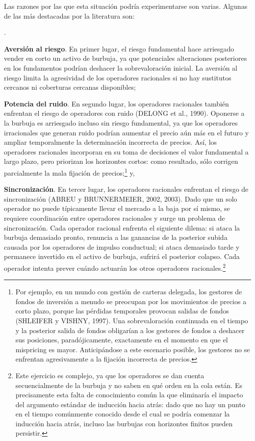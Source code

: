 \documentclass[10pt,a4paper]{article}
\newcounter{numitem}
\newenvironment{lnum}
      {\begin{list}{\arabic{numitem}.}{%
          \usecounter{numitem}%
          \setlength{\leftmargin}{1cm}%
          \setlength{\parskip}{3pt}%
          \setlength{\itemsep}{0pt}%
          \setlength{\parsep}{0pt}%
      }}
      {\end{list}}
\begin{document}
Las razones por las que esta situación podría experimentarse son varias. Algunas de las más destacadas por la literatura son:
\begin{lnum}
    \item \textbf{Aversión al riesgo}. En primer lugar, el riesgo fundamental hace arriesgado vender en corto un activo de burbuja, ya que potenciales alteraciones posteriores en los fundamentos podrían deshacer la sobrevaloración inicial. La aversión al riesgo limita la agresividad de los operadores racionales si no hay sustitutos cercanos ni coberturas cercanas disponibles;
    \item \textbf{Potencia del ruido}. En segundo lugar, los operadores racionales también enfrentan el riesgo de operadores con ruido (DELONG et al., 1990). Oponerse a la burbuja es arriesgado incluso sin riesgo fundamental, ya que los operadores irracionales que generan ruido podrían aumentar el precio aún más en el futuro y ampliar temporalmente la determinación incorrecta de precios. Así, los operadores racionales incorporan en su toma de decisiones el valor fundamental a largo plazo, pero priorizan los horizontes cortos: como resultado, sólo corrigen parcialmente la mala fijación de precios;\footnote{%
        Por ejemplo, en un mundo con gestión de carteras delegada, los gestores de fondos de inversión a menudo se preocupan por los movimientos de precios a corto plazo, porque las pérdidas temporales provocan salidas de fondos (SHLEIFER y VISHNY, 1997). Una sobrevaloración continuada en el tiempo y la posterior salida de fondos obligarían a los gestores de fondos a deshacer sus posiciones, paradójicamente, exactamente en el momento en que el mispricing es mayor. Anticipándose a este escenario posible, los gestores no se enfrentan agresivamente a la fijación incorrecta de precios.
    } y,
    \item \textbf{Sincronización}. En tercer lugar, los operadores racionales enfrentan el riesgo de sincronización (ABREU y BRUNNERMEIER, 2002, 2003). Dado que un solo operador no puede típicamente llevar el mercado a la baja por sí mismo, se requiere coordinación entre operadores racionales y surge un problema de sincronización. Cada operador racional enfrenta el siguiente dilema: si ataca la burbuja demasiado pronto, renuncia a las ganancias de la posterior subida causada por los operadores de impulso conductual; si ataca demasiado tarde y permanece invertido en el activo de burbuja, sufrirá el posterior colapso. Cada operador intenta prever cuándo actuarán los otros operadores racionales.\footnote{%
        Este ejercicio es complejo, ya que los operadores se dan cuenta secuencialmente de la burbuja y no saben en qué orden en la cola están. Es precisamente esta falta de conocimiento común la que eliminaría el impacto del argumento estándar de inducción hacia atrás: dado que no hay un punto en el tiempo comúnmente conocido desde el cual se podría comenzar la inducción hacia atrás, incluso las burbujas con horizontes finitos pueden persistir.
    }
\end{lnum}
\end{document}
